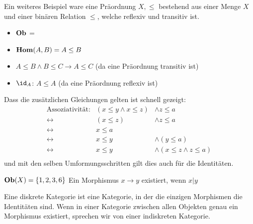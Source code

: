\documentclass{article}
\begin{document}
		 \begin{bsp}
		 Ein weiteres Beispiel ware eine Pr\"aordnung \( X, \leq \) bestehend aus einer Menge \( X \) und einer bin\"aren Relation \( \leq \), welche reflexiv und transitiv ist.
		 
		 \begin{itemize}
			 \item \( \mathbf{Ob}  \) = \BN
			 \item \(   \mathbf{Hom } (A,B) = A \leq B \)
			 \item \( A \leq B \wedge B \leq  C \rightarrow A \leq C \)  (da eine Pr\"aordnung transitiv ist) 
			 \item \( \id_A \): \( A \leq A \) (da eine  Pr\"aordnung reflexiv ist)
		 \end{itemize}
			 Dass die zus\"atzlichen Gleichungen gelten ist schnell gezeigt:
			 \begin{eqnarray}
			  \text{Assoziativit\"at:} &  ( x \leq y \wedge x \leq z ) & \wedge z \leq a \\
					 \leftrightarrow & (x \leq z ) & \wedge  z \leq a \\
					 \leftrightarrow & x \leq a & \\
					 \leftrightarrow & 	x \leq y  & \wedge  (y \leq a) \\
					 \leftrightarrow &   x \leq y & \wedge  (x \leq z  \wedge  z \leq a )\\
			 \end{eqnarray}
			 und mit den selben Umformungsschritten gilt dies auch f\"ur die Identit\"aten.
		\end{bsp}
		
		\begin{bsp}
		
		  \cite[Beispiel 2.2.30]{Bra}
		 \(  \mathbf{Ob} (X) = \left\lbrace 1,2,3,6 \right\rbrace \)
		 Ein Morphismus \(x   \to y \) existiert, wenn \( x \vert y\) \\
		 
		   
		\end{bsp} 
		 
	 	\begin{defi}
	 	 \cite[Beispiel 2.2.31]{Bra}
	 		Eine diskrete Kategorie ist eine Kategorie, in der die einzigen Morphismen die Identit\"aten sind.
	 		Wenn in einer Kategorie zwischen allen Objekten genau ein Morphismus existiert, sprechen wir von einer indiskreten Kategorie.
	 	\end{defi}	
	 		
\end{document}
